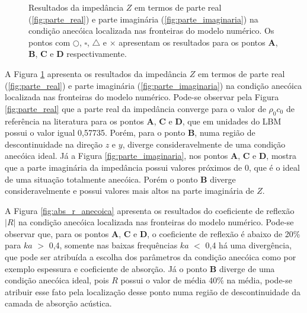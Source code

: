\begin{figure}[ht!]
\begin{subfigure}{\scaleA \textwidth}
  
\end{subfigure}%
\begin{subfigure}{\scaleA \textwidth}
  
\end{subfigure}
\caption[Resultados de impedância na condição anecóica]{Resultados da 
impedância $Z$ em termos de 
parte real (\ref{fig:parte_real}) e parte 
imaginária (\ref{fig:parte_imaginaria}) na condição
 anecóica localizada nas fronteiras do 
 modelo numérico. Os pontos com $\bigcirc$, $\square$, $\bigtriangleup$ e $\times$  
 apresentam os resultados para os pontos 
 \textbf{A}, \textbf{B}, \textbf{C} e \textbf{D} respectivamente.}
\label{fig:impedancia_anecoica}
\end{figure}

A Figura \ref{fig:impedancia_anecoica} apresenta os resultados da 
impedância $Z$ em termos de 
parte real (\ref{fig:parte_real}) e parte 
imaginária (\ref{fig:parte_imaginaria}) na condição
 anecóica localizada nas fronteiras do 
 modelo numérico. Pode-se observar pela Figura \ref{fig:parte_real} que a parte real da 
 impedância converge para o valor de $\rho_{0} c_{0}$ de referência na literatura para os pontos 
 \textbf{A}, \textbf{C} e \textbf{D},
  que em unidades do LBM possui o valor igual 0,57735. Porém, para o ponto \textbf{B}, 
  numa região de descontinuidade na direção $z$ e $y$, diverge consideravelmente de uma condição 
  anecóica ideal. Já a Figura \ref{fig:parte_imaginaria}, nos pontos \textbf{A}, \textbf{C} e \textbf{D},
  mostra que a parte imaginária da impedância possui valores próximos de 0, que é o ideal de uma situação 
  totalmente anecóica. Porém o ponto \textbf{B} diverge consideravelmente e possui valores mais altos na parte imaginária de $Z$.

\newpage
\begin{figure}[ht!]
\centering
  
\end{figure}


A Figura \ref{fig:abs_r_anecoica} apresenta os resultados do coeficiente de reflexão $|R|$ na condição anecóica localizada nas fronteiras do 
 modelo numérico. Pode-se observar que, para os pontos \textbf{A}, \textbf{C} e \textbf{D},
  o coeficiente de reflexão é abaixo de 20\% para $ka$ $>$ 0,4, 
  somente nas baixas frequências $ka$ $<$ 0,4 há uma divergência, que pode ser atribuída
   a escolha dos parâmetros da condição anecóica como por exemplo espessura e coeficiente de absorção.
   Já o ponto \textbf{B} diverge de uma condição anecóica ideal, pois $R$ possui o valor de média 40\% na média, 
   pode-se atribuir esse fato pela localização desse ponto numa região de descontinuidade da camada de absorção acústica.

